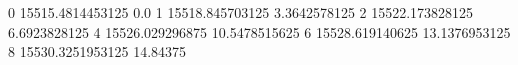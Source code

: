 0 15515.4814453125 0.0
1 15518.845703125 3.3642578125
2 15522.173828125 6.6923828125
4 15526.029296875 10.5478515625
6 15528.619140625 13.1376953125
8 15530.3251953125 14.84375
